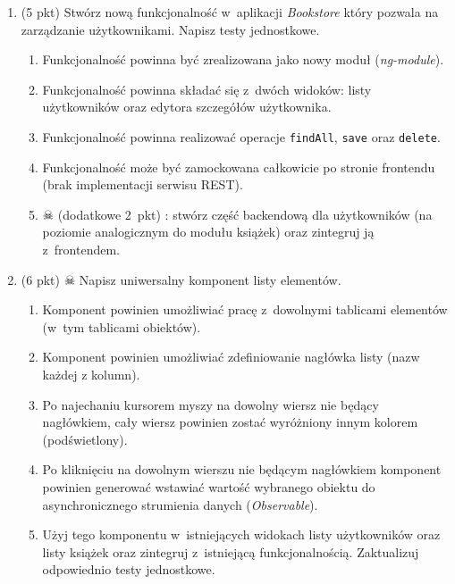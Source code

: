 \documentclass[12pt]{article}
\begin{document}
\begin{enumerate}
        \item\label{exc:module}
            (5 pkt) Stwórz nową funkcjonalność w~aplikacji \textit{Bookstore} który pozwala na zarządzanie użytkownikami. Napisz testy jednostkowe.
            \begin{enumerate}
                \item Funkcjonalność powinna być zrealizowana jako nowy moduł (\textit{ng-module}).
                \item Funkcjonalność powinna składać się z~dwóch widoków: listy użytkowników oraz edytora szczegółów użytkownika.
                \item Funkcjonalność powinna realizować operacje \texttt{findAll}, \texttt{save} oraz \texttt{delete}.
                \item Funkcjonalność może być zamockowana całkowicie po stronie frontendu (brak implementacji serwisu REST).
                \item $\skull$ (dodatkowe 2~pkt) : stwórz część backendową dla użytkowników (na poziomie analogicznym do modułu książek) oraz zintegruj ją z~frontendem.
            \end{enumerate}
        \item\label{exc:component}
            (6 pkt) $\skull$ Napisz uniwersalny komponent listy elementów.
            \begin{enumerate}
              \item Komponent powinien umożliwiać pracę z~dowolnymi tablicami elementów (w~tym tablicami obiektów).
              \item Komponent powinien umożliwiać zdefiniowanie nagłówka listy (nazw każdej z kolumn).
              \item Po najechaniu kursorem myszy na dowolny wiersz nie będący nagłówkiem, cały wiersz powinien zostać wyróżniony innym kolorem (podświetlony).
              \item Po kliknięciu na dowolnym wierszu nie będącym nagłówkiem komponent powinien generować wstawiać wartość wybranego obiektu do asynchronicznego strumienia danych (\textit{Observable}).
              \item Użyj tego komponentu w~istniejących widokach listy użytkowników oraz listy książek oraz zintegruj z~istniejącą funkcjonalnością. Zaktualizuj odpowiednio testy jednostkowe.
            \end{enumerate}
    \end{enumerate}
\end{document}
